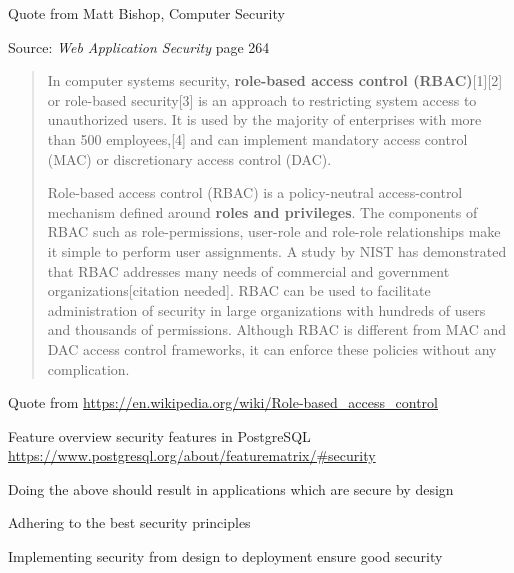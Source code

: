 \documentclass[Screen16to9,17pt]{foils}
\begin{document}
Quote from Matt Bishop, Computer Security



Source: \emph{Web Application Security} page 264



\begin{quote}
In computer systems security, {\bf role-based access control (RBAC)}[1][2] or role-based security[3] is an approach to restricting system access to unauthorized users. It is used by the majority of enterprises with more than 500 employees,[4] and can implement mandatory access control (MAC) or discretionary access control (DAC).

Role-based access control (RBAC) is a policy-neutral access-control mechanism defined around {\bf roles and privileges}. The components of RBAC such as role-permissions, user-role and role-role relationships make it simple to perform user assignments. A study by NIST has demonstrated that RBAC addresses many needs of commercial and government organizations[citation needed]. RBAC can be used to facilitate administration of security in large organizations with hundreds of users and thousands of permissions. Although RBAC is different from MAC and DAC access control frameworks, it can enforce these policies without any complication.
\end{quote}
Quote from \url{https://en.wikipedia.org/wiki/Role-based_access_control}




Feature overview security features in PostgreSQL\\
\url{https://www.postgresql.org/about/featurematrix/#security}




\begin{list2}
\item Doing the above should result in applications which are secure by design
\item Adhering to the best security principles
\item Implementing security from design to deployment ensure good security
\end{list2}
\end{document}
